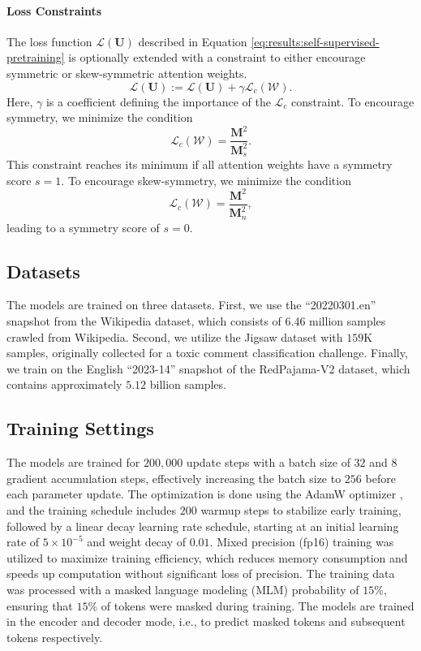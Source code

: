 \paragraph{Loss Constraints}
The loss function $\mathcal{L}(\bm{U})$ described in Equation \eqref{eq:results:self-supervised-pretraining} is optionally extended with a constraint to either encourage symmetric or skew-symmetric attention weights.
%
\begin{equation}
    \mathcal{L}(\bm{U}) := \mathcal{L}(\bm{U}) + \gamma \mathcal{L}_{c}(\mathcal{W}).
\end{equation}
%
Here, $\gamma$ is a coefficient defining the importance of the $\mathcal{L}_{c}$ constraint.
To encourage symmetry, we minimize the condition
%
\begin{equation}
    \mathcal{L}_c(\mathcal{W}) = \frac{\bm{M}^2}{\bm{M}_s^2}.
\end{equation}
%
This constraint reaches its minimum if all attention weights have a symmetry score $s=1$.
To encourage skew-symmetry, we minimize the condition
%
\begin{equation}
    \mathcal{L}_c(\mathcal{W}) = \frac{\bm{M}^2}{\bm{M}_n^2},
\end{equation}
%
leading to a symmetry score of $s=0$.



\subsection{Datasets}\label{sec:exp_bertmodels_datasets}
The models are trained on three datasets.
First, we use the ``20220301.en'' snapshot from the Wikipedia dataset, which consists of 6.46 million samples crawled from Wikipedia. Second, we utilize the Jigsaw dataset with $159$K samples, originally collected for a toxic comment classification challenge.
Finally, we train on the English ``2023-14'' snapshot of the RedPajama-V2 dataset, which contains approximately $5.12$ billion samples.

\subsection{Training Settings}\label{sec:exp_bertmodels_training}
The models are trained for $200,000$ update steps with a batch size of $32$ and $8$ gradient accumulation steps, effectively increasing the batch size to $256$ before each parameter update. The optimization is done using the AdamW optimizer \citep{Loshchilov_Hutter_2019}, and the training schedule includes $200$ warmup steps to stabilize early training, followed by a linear decay learning rate schedule, starting at an initial learning rate of $5 \times 10^{-5}$ and weight decay of $0.01$.
Mixed precision (fp16) training was utilized to maximize training efficiency, which reduces memory consumption and speeds up computation without significant loss of precision. The training data was processed with a masked language modeling (MLM) probability of $15$\%, ensuring that $15$\% of tokens were masked during training.
The models are trained in the encoder and decoder mode, i.e., to predict masked tokens and subsequent tokens respectively.

